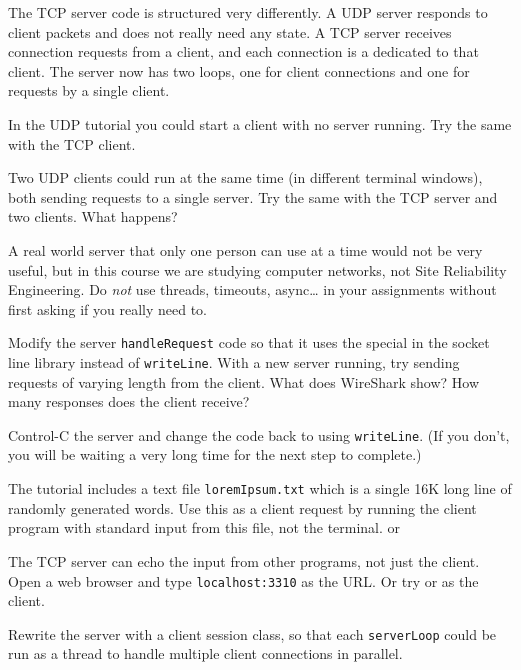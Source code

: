 The TCP server code is structured very differently. A UDP server responds
to client packets and does not really need any state. A TCP server receives
connection requests from a client, and each connection is a 
dedicated to that client. The server now has two loops, one for client connections
and one for requests by a single client.



In the UDP tutorial you could start a client with no server running. Try the
same with the TCP client.

Two UDP clients could run at the same time (in different terminal windows),
both sending requests to a single server. Try the same with the TCP server
and two clients. What happens?

\begin{IMPORTANT}
A real world server that only one person can use at a time would not be very
useful, but in this course we are studying computer networks, not Site
Reliability Engineering. Do \emph{not} use threads, timeouts, async\ldots
in your assignments without first asking if you really need to.
\end{IMPORTANT}

\STEP Modify the server \texttt{handleRequest} code so that it uses the special
 in the socket line library instead of \texttt{writeLine}.
With a new server running, try sending requests of varying length from the
client. What does WireShark show? How many responses does the client receive?

Control-C the server and change the code back to using \texttt{writeLine}.
(If you don't, you will be waiting a very long time for the next step to
complete.)

\STEP The tutorial includes a text file \texttt{loremIpsum.txt} which is a
single 16K long line of randomly generated words. Use this as a client
request by running the client program with standard input from this file,
not the terminal.
or



The TCP server can echo the input from other programs, not just the client.
Open a web browser and type \texttt{localhost:3310} as the URL.
Or try  or  as the client. 

Rewrite the server with a client session class, so that each \texttt{serverLoop}
could be run as a thread to handle multiple client connections in parallel.

\COPYRIGHT


